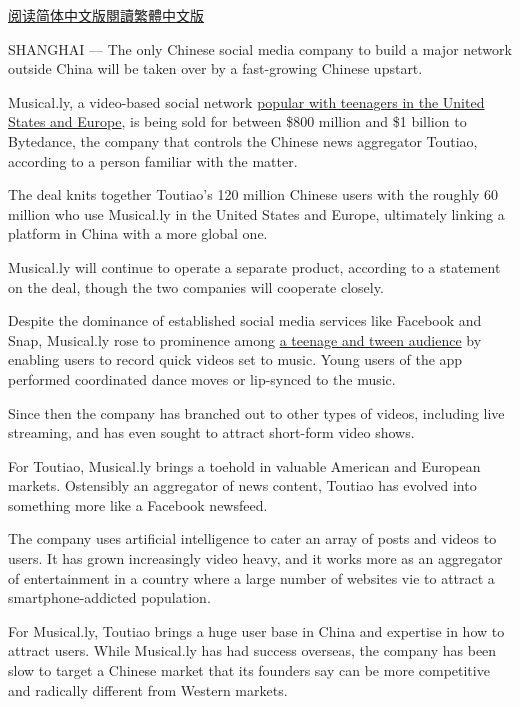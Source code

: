 \href{https://cn.nytimes3xbfgragh.onion/business/20171113/musically-sold-app-video/}{阅读简体中文版}\href{https://cn.nytimes3xbfgragh.onion/business/20171113/musically-sold-app-video/zh-hant/}{閱讀繁體中文版}

SHANGHAI --- The only Chinese social media company to build a major
network outside China will be taken over by a fast-growing Chinese
upstart.

Musical.ly, a video-based social network
\href{https://www.nytimes3xbfgragh.onion/2016/08/10/technology/china-homegrown-internet-companies-rest-of-the-world.html}{popular
with teenagers in the United States and Europe}, is being sold for
between \$800 million and \$1 billion to Bytedance, the company that
controls the Chinese news aggregator Toutiao, according to a person
familiar with the matter.

The deal knits together Toutiao's 120 million Chinese users with the
roughly 60 million who use Musical.ly in the United States and Europe,
ultimately linking a platform in China with a more global one.

Musical.ly will continue to operate a separate product, according to a
statement on the deal, though the two companies will cooperate closely.

Despite the dominance of established social media services like Facebook
and Snap, Musical.ly rose to prominence among
\href{https://www.nytimes3xbfgragh.onion/2016/09/17/business/media/a-social-network-frequented-by-children-tests-the-limits-of-online-regulation.html}{a
teenage and tween audience} by enabling users to record quick videos set
to music. Young users of the app performed coordinated dance moves or
lip-synced to the music.

Since then the company has branched out to other types of videos,
including live streaming, and has even sought to attract short-form
video shows.

For Toutiao, Musical.ly brings a toehold in valuable American and
European markets. Ostensibly an aggregator of news content, Toutiao has
evolved into something more like a Facebook newsfeed.

The company uses artificial intelligence to cater an array of posts and
videos to users. It has grown increasingly video heavy, and it works
more as an aggregator of entertainment in a country where a large number
of websites vie to attract a smartphone-addicted population.

For Musical.ly, Toutiao brings a huge user base in China and expertise
in how to attract users. While Musical.ly has had success overseas, the
company has been slow to target a Chinese market that its founders say
can be more competitive and radically different from Western markets.

